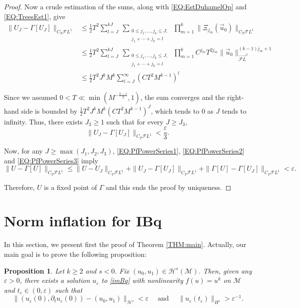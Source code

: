 \documentclass[letterpaper, 11pt,  reqno]{amsart}
\newtheorem{proposition}[theorem]{Proposition}
\newcommand{\1}{\hspace{0.5mm}\text{I}\hspace{0.5mm}}
\newcommand{\noi}{\noindent}
\newcommand{\M}{\mathcal{M}}
\newcommand{\FL}{\mathcal{F}L} %
\newcommand{\FLv}{\overrightarrow{\mathcal{F}L}}
\renewcommand{\H}{\mathcal{H}}
\newcommand{\eps}{\varepsilon}
\newcommand{\G}{\Gamma}
\newcommand{\dt}{\partial_t}
\numberwithin{equation}{section}
\numberwithin{theorem}{section}
\begin{document}
\begin{proof}
\noi Now a crude estimation of the sums, along with \eqref{EQ:EstDuhamelOp} and \eqref{EQ:TreesEst1}, give
\begin{align*}
\| U_J - \G[U_J] \|_{C_T \FL^1} & \leq \frac 12 T^2 \sum^{kJ}_{l = J} \  \sum_{\substack{0 \leq j_1 , \dots, j_k \leq J, \\ j_1 + \cdots + j_k = l}} \   \prod^k_{m=1} \| \Xi_{j_m}(\vec{u}_0) \|_{C_T \FL^1}  \\
	& \leq \frac 12 T^2 \sum^{kJ}_{l = J} \  \sum_{\substack{0 \leq j_1 , \dots,  j_k \leq J, \\ j_1 + \cdots + j_k = l}} \ \prod^k_{m= 1} C^{j_m} T^{2j_m} \| \vec{u}_0 \|^{(k-1)j_m + 1}_{\FLv^1} \\
	& \leq \frac 12 T^2 J^k M^k \sum^{\infty}_{l = J} (C T^2 M^{k-1})^l
\end{align*}

\noi Since we assumed $0 < T \ll \min(M^{-\frac{k-1}{2} }, 1)$, the sum converges and the right-hand side is bounded by $\frac 12 T^2 J^k M^k (C T^2 M^{k-1})^J$, which tends to $0$ as $J$ tends to infinity. Thus, there exists $J_3 \geq 1$ such that for every $J \geq J_3$,
\begin{equation}
\label{EQ:PfPowerSeries3}
\| U_J - \G[U_J] \|_{C_T \FL^1} < \frac \eps3.
\end{equation}

\noi Now, for any $J \geq \max(J_1, J_2, J_3)$, \eqref{EQ:PfPowerSeries1}, \eqref{EQ:PfPowerSeries2} and \eqref{EQ:PfPowerSeries3} imply
$$
\| U - \G[U] \|_{C_T \FL^1} \leq \| U - U_J \|_{C_T \FL^1} + \| U_J - \G[U_J] \|_{C_T \FL^1} + \| \G[U] - \G[U_J] \|_{C_T \FL^1}  < \eps.
$$

\noi Therefore, $U$ is a fixed point of $\G$ and this ends the proof by uniqueness.

\end{proof}









\section{Norm inflation for IBq}
\label{Sec3}

In this section, we present first the proof of Theorem \ref{THM:main}. Actually, our main goal is to prove the following proposition:

\begin{proposition}
\label{THM:main2}
Let $k \geq 2$ and $s < 0$. Fix $(u_0 , u_1) \in \H^s (\M)$. Then, given any $\eps > 0$, there exists a solution $u_\eps$ to \eqref{imBq} with nonlinearity $f(u) = u^k$ on $\M$ and $t_\eps \in (0, \eps)$ such that
$$
\| (u_\eps (0), \dt u_\eps (0)) - (u_0 , u_1) \|_{\H^s} < \eps \quad \text{ and } \quad \| u_\eps (t_\eps) \|_{H^s} > \eps^{-1}.
$$
\end{proposition}
\end{document}
